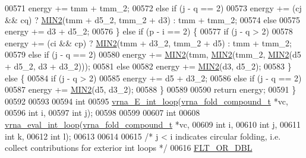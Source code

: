 \begin{DoxyCode}
00571       energy += tmm + tmm\_2;
00572     \textcolor{keywordflow}{else} \textcolor{keywordflow}{if} (j - q == 2)
00573       energy += (cj && cq) ? \mbox{\hyperlink{group__utils_gae0b9cd0ce090bd69b951aa73e8fa4f7d}{MIN2}}(tmm + d5\_2, tmm\_2 + d3) : tmm + tmm\_2;
00574     \textcolor{keywordflow}{else}
00575       energy += d3 + d5\_2;
00576   \} \textcolor{keywordflow}{else} \textcolor{keywordflow}{if} (p - i == 2) \{
00577     \textcolor{keywordflow}{if} (j - q > 2)
00578       energy += (ci && cp) ? \mbox{\hyperlink{group__utils_gae0b9cd0ce090bd69b951aa73e8fa4f7d}{MIN2}}(tmm + d3\_2, tmm\_2 + d5) : tmm + tmm\_2;
00579     \textcolor{keywordflow}{else} \textcolor{keywordflow}{if} (j - q == 2)
00580       energy += \mbox{\hyperlink{group__utils_gae0b9cd0ce090bd69b951aa73e8fa4f7d}{MIN2}}(tmm, \mbox{\hyperlink{group__utils_gae0b9cd0ce090bd69b951aa73e8fa4f7d}{MIN2}}(tmm\_2, \mbox{\hyperlink{group__utils_gae0b9cd0ce090bd69b951aa73e8fa4f7d}{MIN2}}(d5 + d5\_2, d3 + d3\_2)));
00581     \textcolor{keywordflow}{else}
00582       energy += \mbox{\hyperlink{group__utils_gae0b9cd0ce090bd69b951aa73e8fa4f7d}{MIN2}}(d3, d5\_2);
00583   \} \textcolor{keywordflow}{else} \{
00584     \textcolor{keywordflow}{if} (j - q > 2)
00585       energy += d5 + d3\_2;
00586     \textcolor{keywordflow}{else} \textcolor{keywordflow}{if} (j - q == 2)
00587       energy += \mbox{\hyperlink{group__utils_gae0b9cd0ce090bd69b951aa73e8fa4f7d}{MIN2}}(d5, d3\_2);
00588   \}
00589 
00590   \textcolor{keywordflow}{return} energy;
00591 \}
00592 
00593 
00594 \textcolor{keywordtype}{int}
00595 \mbox{\hyperlink{group__loops_ga8aab34f532276b7e38837d78ef591847}{vrna\_E\_int\_loop}}(\mbox{\hyperlink{group__fold__compound_structvrna__fc__s}{vrna\_fold\_compound\_t}}  *vc,
00596                 \textcolor{keywordtype}{int}                   i,
00597                 \textcolor{keywordtype}{int}                   j);
00598 
00599 
00607 \textcolor{keywordtype}{int}
00608 \mbox{\hyperlink{group__loops_ga018f1314dbbae42fdd27c94670b61721}{vrna\_eval\_int\_loop}}(\mbox{\hyperlink{group__fold__compound_structvrna__fc__s}{vrna\_fold\_compound\_t}} *vc,
00609                    \textcolor{keywordtype}{int}                  i,
00610                    \textcolor{keywordtype}{int}                  j,
00611                    \textcolor{keywordtype}{int}                  k,
00612                    \textcolor{keywordtype}{int}                  l);
00613 
00614 
00615 \textcolor{comment}{/* j < i indicates circular folding, i.e. collect contributions for exterior int loops */}
00616 \mbox{\hyperlink{group__data__structures_ga31125aeace516926bf7f251f759b6126}{FLT\_OR\_DBL}}

\end{DoxyCode}
